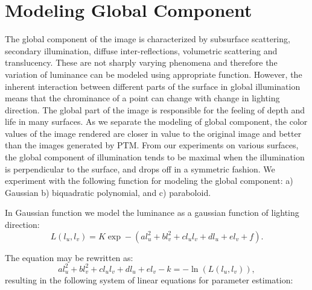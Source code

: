 \section{Modeling Global Component}

The global component of the image is characterized by subsurface scattering,
secondary illumination, diffuse inter-reflections, volumetric scattering and
translucency. These are not sharply varying phenomena and therefore the
variation of luminance can be modeled using appropriate function. However, the
inherent interaction between different parts of the surface in global
illumination means that the chrominance of a point can change with change in
lighting direction. The global part of the image is responsible for the feeling
of depth and life in many surfaces. As we separate the modeling of global
component, the color values of the image rendered are closer in value to the
original image and better than the images generated by PTM. From our experiments
on various surfaces, the global component of illumination tends to be maximal
when the illumination is perpendicular to the surface, and drops off in a
symmetric fashion. We experiment with the following function for modeling the
global component: a) Gaussian b) biquadratic polynomial, and c) paraboloid.

In Gaussian function we model the luminance as a gaussian function of lighting
direction:
\begin{equation}
L(l_u,l_v)=K\exp-(al_u^2 + bl_v^2 + cl_ul_v + dl_u + el_v +f  ).
\end{equation}

The equation may be rewritten as:
\begin{equation}
al_u^2 + bl_v^2 + cl_ul_v + dl_u + el_v -k= -\ln(L(l_u,l_v)),
\end{equation}
resulting in the following system of linear equations for parameter estimation:


